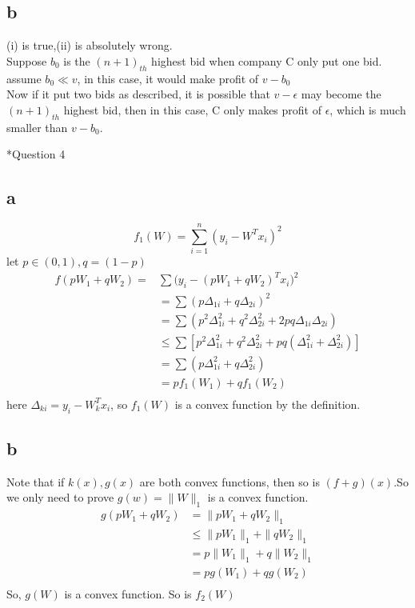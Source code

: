 \documentclass[12pt]{amsart}
\makeatletter
\renewcommand{\section}{\@startsection{section}{1}{0mm}
{-\baselineskip}{0.5\baselineskip}{\bf\leftline}}
\makeatother
\begin{document}
\subsection*{b}
(i) is true,(ii) is absolutely wrong.\\
Suppose $b_0$ is the $(n+1)_{th}$ highest bid when company C only put one bid.
assume $b_0 \ll v$, in this case, it would make profit of $v-b_0$\\
Now if it put two bids as described, 
it is possible that $v-\epsilon$ may become the $(n+1)_{th}$ highest bid, then 
in this case, C only makes profit of $\epsilon$, which is much smaller than $v-b_0$.

\section*{Question 4}
\subsection*{a}
$$
f_1(W) = \sum_{i=1}^n(y_i-W^Tx_i)^2
$$
let $p\in(0,1),q=(1-p)$
\begin{align*}
  \label{eq:2}
  f(pW_1+qW_2) =& \sum\big(y_i-(pW_1+qW_2)^Tx_i\big)^2\\
              &=\sum(p\Delta_{1i} + q\Delta_{2i})^2\\
              &=\sum(p^2\Delta_{1i}^2 + q^2\Delta_{2i}^2 + 2pq\Delta_{1i}\Delta_{2i})\\
              &\leq\sum[p^2\Delta_{1i}^2 + q^2\Delta_{2i}^2 + pq(\Delta_{1i}^2+\Delta_{2i}^2)]\\
              &=\sum(p\Delta_{1i}^2+q\Delta_{2i}^2)\\
              &=pf_1(W_1)+qf_1(W_2)\\
\end{align*}
here $\Delta_{ki} = y_i-W_k^Tx_i$, so $f_1(W)$ is a convex function by the definition. 
\subsection*{b}
Note that if $k(x),g(x)$ are both convex functions, then so is $(f+g)(x)$.So we only need to prove $g(w) = \|W\|_1$ is a convex function.\\
\begin{align*}
g(pW_1+qW_2) &= \|pW_1+qW_2\|_1 \\
            &\leq \|pW_1\|_1+\|qW_2\|_1\\
            &= p\|W_1\|_1+q\|W_2\|_1\\
            &=pg(W_1)+qg(W_2)\\
\end{align*}
So, $g(W)$ is a convex function. So is $f_2(W)$
\end{document}
